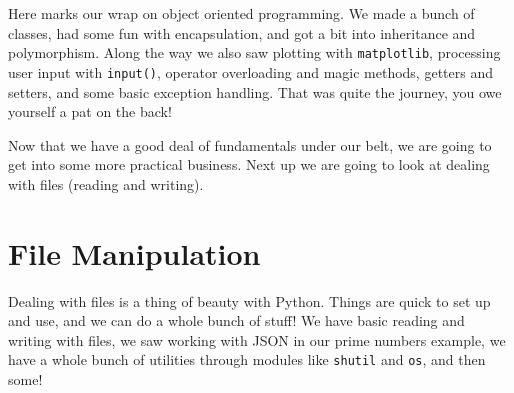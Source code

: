 \documentclass[11pt, twoside, reqno]{book}
\begin{document}
Here marks our wrap on object oriented programming. We made a bunch of classes, had some fun with encapsulation, and got a bit into inheritance and polymorphism. Along the way we also saw plotting with \texttt{matplotlib}, processing user input with \texttt{input()}, operator overloading and magic methods, getters and setters, and some basic exception handling. That was quite the journey, you owe yourself a pat on the back!

Now that we have a good deal of fundamentals under our belt, we are going to get into some more practical business. Next up we are going to look at dealing with files (reading and writing).

\section{File Manipulation}

Dealing with files is a thing of beauty with Python. Things are quick to set up and use, and we can do a whole bunch of stuff! We have basic reading and writing with files, we saw working with JSON in our prime numbers example, we have a whole bunch of utilities through modules like \texttt{shutil} and \texttt{os}, and then some!
\end{document}
